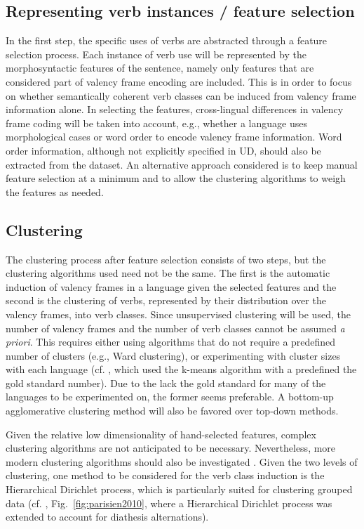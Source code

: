 \subsection{Representing verb instances / feature selection}\label{subsec:features}

In the first step, the specific uses of verbs are abstracted through a feature selection process. Each instance of verb use will be represented by the morphosyntactic features of the sentence, namely only features that are considered part of valency frame encoding are included. This is in order to focus on whether semantically coherent verb classes can be induced from valency frame information alone. In selecting the features, cross-lingual differences in valency frame coding will be taken into account, e.g., whether a language uses morphological cases or word order to encode valency frame information. Word order information, although not explicitly specified in UD, should also be extracted from the dataset. An alternative approach considered is to keep manual feature selection at a minimum and to allow the clustering algorithms to weigh the features as needed.

\subsection{Clustering}\label{subsec:clustering}

The clustering process after feature selection consists of two steps, but the clustering algorithms used need not be the same. The first is the automatic induction of valency frames in a language given the selected features and the second is the clustering of verbs, represented by their distribution over the valency frames, into verb classes. Since unsupervised clustering will be used, the number of valency frames and the number of verb classes cannot be assumed \textit{a priori}. This requires either using algorithms that do not require a predefined number of clusters (e.g., Ward clustering), or experimenting with cluster sizes with each language (cf. \cite{schulteimwalde2006}, which used the k-means algorithm with a predefined the gold standard number). Due to the lack the gold standard for many of the languages to be experimented on, the former seems preferable. A bottom-up agglomerative clustering method will also be favored over top-down methods.

Given the relative low dimensionality of hand-selected features, complex clustering algorithms are not anticipated to be necessary. Nevertheless, more modern clustering algorithms should also be investigated \citep{xu2015a}. Given the two levels of clustering, one method to be considered for the verb class induction is the Hierarchical Dirichlet process, which is particularly suited for clustering grouped data (cf. \citet{parisien2010}, Fig.~\ref{fig:parisien2010}, where a Hierarchical Dirichlet process was extended to account for diathesis alternations).

